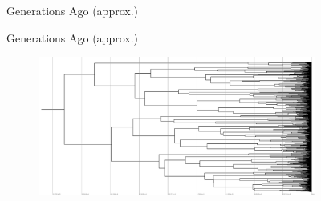 \begin{figure}
  \begin{minipage}{1\columnwidth}
    \centering
    Generations Ago (approx.)
  \end{minipage}
  \hfill
  \begin{minipage}{1\columnwidth}
    \centering
    Generations Ago (approx.)
  \end{minipage}
  \begin{minipage}{1\columnwidth}
    \hspace{0.02\linewidth}
      \hfill
      \hfill
      \hfill
      \hfill
  \end{minipage}
  \hfill
  \begin{minipage}{1\columnwidth}
    \hspace{0.02\linewidth}
      \hfill
      \hfill
      \hfill
      \hfill
  \end{minipage}
  \begin{subfigure}[b]{1\columnwidth}
    \includegraphics[height=0.12\textheight,width=\textwidth]{img/perfect-tree-phylogenies-log/epoch=7+resolution=3+treatment=0/a=collapsed-phylogeny+epoch=00007+mut_distn=np.random.standard_normal+num_generations=32768+num_islands=1024+num_niches=1+p_island_migration=0.01+p_niche_invasion=3.0517578125e-08+population_size=3276.../8+replicate=0+tournament_size=4+treatment=0+_generation=262144+_index=0+ext=.pdf}

\end{subfigure}
\end{figure}

